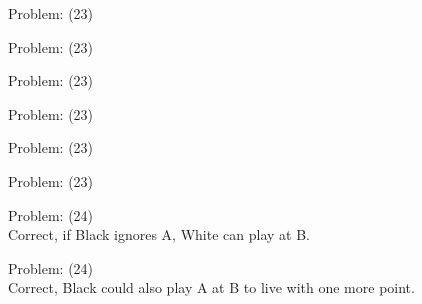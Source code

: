 \documentclass[11pt]{article}
\begin{document}
\begin{minipage}[t]{0.5\textwidth}
  {\centering
  
  Problem: (23)\\
  
  }
\end{minipage}
\begin{minipage}[t]{0.5\textwidth}
  {\centering
  
  Problem: (23)\\
  
  }
\end{minipage}
\begin{minipage}[t]{0.5\textwidth}
  {\centering
  
  Problem: (23)\\
  
  }
\end{minipage}
\begin{minipage}[t]{0.5\textwidth}
  {\centering
  
  Problem: (23)\\
  
  }
\end{minipage}
\begin{minipage}[t]{0.5\textwidth}
  {\centering
  
  Problem: (23)\\
  
  }
\end{minipage}
\begin{minipage}[t]{0.5\textwidth}
  {\centering
  
  Problem: (23)\\
  
  }
\end{minipage}
\begin{minipage}[t]{0.5\textwidth}
  {\centering
  
  Problem: (24)\\
  Correct, if Black ignores A, White can play at B.\\
  }
\end{minipage}
\begin{minipage}[t]{0.5\textwidth}
  {\centering
  
  Problem: (24)\\
  Correct, Black could also play A at B to live with one more point.\\
  }
\end{minipage}
\end{document}
